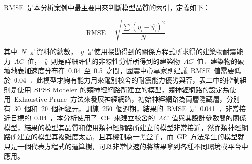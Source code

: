 RMSE~是本分析案例中最主要用來判斷模型品質的索引，定義如下：


\begin{equation} \text{RMSE} = \sqrt{\dfrac{\sum{(y_i - \hat{y_i})^2}}{N}} \label{eq:RMSE2}\end{equation}

其中~$N$~是資料的總數，~$y$~是使用探勘得到的關係方程式所求得的建築物耐震能力~$AC$~值，~$\hat{y}$~則是詳細評估的非線性分析所得到的建築物~$AC$~值，建築物的破壞地表加速度分布在~0.04~至~0.5~之間，國震中心專家則建議~RMSE~值需要低於~0.04~，此模型才夠有能力用來鑑別校舍的耐震能力優劣與否，表二中的控制組則是使用~SPSS Modeler~的類神經網路所建立的模型，類神經網路的設定為使用~Exhaustive Prune~方法來發展神經網路，初始神經網路為兩層隱藏層，分別有~30~個和~20~個神經元，訓練~250~個週期，結果的~RMSE~是~0.041~，非常接近目標的~0.04~，本分析使用了~GP~來建立校舍的~$AC$~值與其設計參數間的關係模型，結果的模型其品質和使用類神經網路所建立的模型非常接近，然而類神經網路所建立的模型其複雜度太高，且其機制為一黑盒子，而~GP~方法產生的模型就只是一個代表方程式的運算樹，可以非常快速的將結果拿到各種不同環境或平台中應用。



